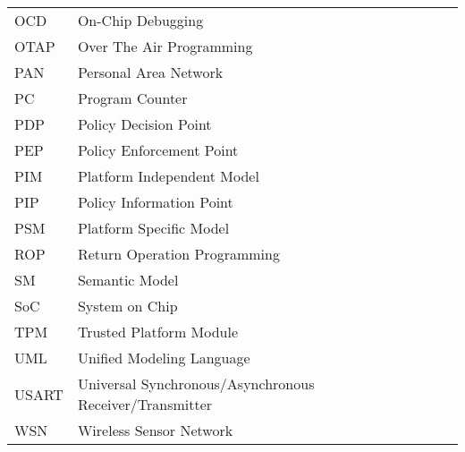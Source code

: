 \begin{flushleft}
  \renewcommand{\arraystretch}{1.1}
  \begin{tabularx}{\textwidth}{@{}p{24mm}X@{}}
OCD       &  On-Chip Debugging \\
OTAP      &  Over The Air Programming \\
PAN       &  Personal Area Network \\
PC        &  Program Counter \\
PDP       &  Policy Decision Point \\
PEP       &  Policy Enforcement Point \\
PIM       &  Platform Independent Model \\
PIP       &  Policy Information Point \\
PSM       &  Platform Specific Model \\
ROP       &  Return Operation Programming \\
SM        &  Semantic Model \\
SoC       &  System on Chip \\
TPM       &  Trusted Platform Module \\
UML       &  Unified Modeling Language \\
USART     &  Universal Synchronous/Asynchronous Receiver/Transmitter \\
WSN       &  Wireless Sensor Network \\
  \end{tabularx}
\end{flushleft}
